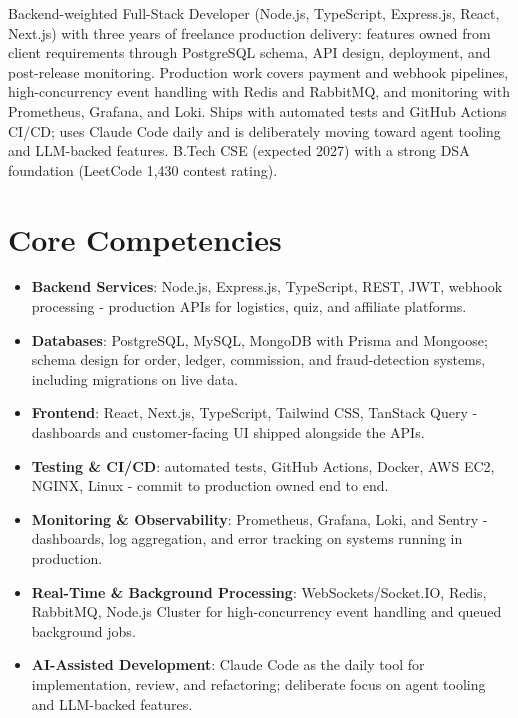 \documentclass[11pt,a4paper,sans]{moderncv}
\begin{document}
\makecvtitle


\vspace{6pt}
\small{Backend-weighted Full-Stack Developer (Node.js, TypeScript, Express.js, React, Next.js) with three years of freelance production delivery: features owned from client requirements through PostgreSQL schema, API design, deployment, and post-release monitoring. Production work covers payment and webhook pipelines, high-concurrency event handling with Redis and RabbitMQ, and monitoring with Prometheus, Grafana, and Loki. Ships with automated tests and GitHub Actions CI/CD; uses Claude Code daily and is deliberately moving toward agent tooling and LLM-backed features. B.Tech CSE (expected 2027) with a strong DSA foundation (LeetCode 1,430 contest rating).}


\section{Core Competencies}
\vspace{1pt}
\begin{itemize}

\item \textbf{Backend Services}: Node.js, Express.js, TypeScript, REST, JWT, webhook processing - production APIs for logistics, quiz, and affiliate platforms.

\item \textbf{Databases}: PostgreSQL, MySQL, MongoDB with Prisma and Mongoose; schema design for order, ledger, commission, and fraud-detection systems, including migrations on live data.

\item \textbf{Frontend}: React, Next.js, TypeScript, Tailwind CSS, TanStack Query - dashboards and customer-facing UI shipped alongside the APIs.

\item \textbf{Testing \& CI/CD}: automated tests, GitHub Actions, Docker, AWS EC2, NGINX, Linux - commit to production owned end to end.

\item \textbf{Monitoring \& Observability}: Prometheus, Grafana, Loki, and Sentry - dashboards, log aggregation, and error tracking on systems running in production.

\item \textbf{Real-Time \& Background Processing}: WebSockets/Socket.IO, Redis, RabbitMQ, Node.js Cluster for high-concurrency event handling and queued background jobs.

\item \textbf{AI-Assisted Development}: Claude Code as the daily tool for implementation, review, and refactoring; deliberate focus on agent tooling and LLM-backed features.

\end{itemize}
\end{document}
